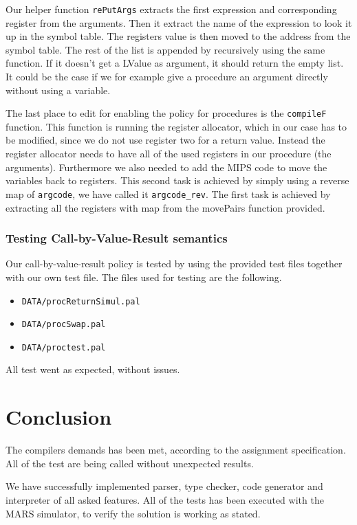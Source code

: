 \documentclass[10pt]{article}
\begin{document}
Our helper function \texttt{rePutArgs} extracts the first expression and corresponding register from the arguments. Then it extract the name of the expression to look it up in the symbol table. The registers value is then moved to the address from the symbol table. The rest of the list is appended by recursively using the same function. If it doesn't get a LValue as argument, it should return the empty list. It could be the case if we for example give a procedure an argument directly without using a variable.

The last place to edit for enabling the policy for procedures is the \texttt{compileF} function. This function is running the register allocator, which in our case has to be modified, since we do not use register two for a return value. Instead the register allocator needs to have all of the used registers in our procedure (the arguments). Furthermore we also needed to add the MIPS code to move the variables back to registers. This second task is achieved by simply using a reverse map of \texttt{argcode}, we have called it \texttt{argcode\_rev}. The first task is achieved by extracting all the registers with map from the movePairs function provided.

\subsubsection{Testing Call-by-Value-Result semantics}
Our call-by-value-result policy is tested by using the provided test files together with our own test file. The files used for testing are the following.
\begin{itemize}
\item{\texttt{DATA/procReturnSimul.pal}}
\item{\texttt{DATA/procSwap.pal}}
\item{\texttt{DATA/proctest.pal}}
\end{itemize}

All test went as expected, without issues.

\section{Conclusion}
The compilers demands has been met, according to the assignment specification. All of the test are being called without unexpected results.

We have successfully implemented parser, type checker, code generator and interpreter of all asked features. All of the tests has been executed with the MARS simulator, to verify the solution is working as stated.
\end{document}
